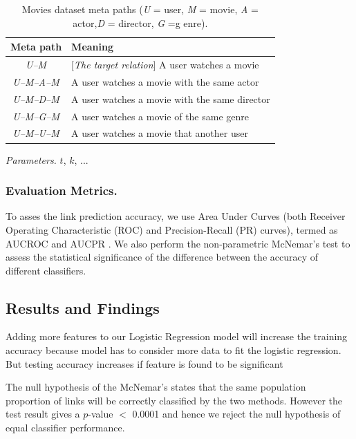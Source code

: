 \begin{table}[h]
\centering
\caption{Movies dataset meta paths (\textit{U} = user, \textit{M} = movie, \textit{A} = actor,\textit{D} = director, \textit{G} =g enre).}
\label{table_movies}\scriptsize
\begin{tabular}{|c|l|} \hline
\textbf{Meta path} & \textbf{Meaning} \\ \hline
\textit{U--M} & [\textit{The target relation}] A user watches a movie \\ \hline

\textit{U--M--A--M} & A user watches a movie with the same actor \\ \hline
\textit{U--M--D--M} & A user watches a movie with the same director \\ \hline
\textit{U--M--G--M} & A user watches a movie of the same genre \\ \hline
\textit{U--M--U--M} & A user watches a movie that another user  \\ \hline

\end{tabular}
\end{table}


\textit{Parameters.} $t$, $k$, ...


\subsubsection{Evaluation Metrics.} 

To asses the link prediction accuracy, we use Area Under Curves (both Receiver Operating Characteristic (ROC) and Precision-Recall (PR) curves), termed as AUCROC and AUCPR \cite{davis2006relationship}. We also perform the non-parametric McNemar's test \cite{mcnemar1947note} to assess the statistical significance of the difference between the accuracy of different classifiers.


\subsection{Results and Findings}

Adding more features to our Logistic Regression model will increase the training accuracy because model has to consider more data to fit the logistic regression. But testing accuracy increases if feature is found to be significant

The null hypothesis of the McNemar's states that the same population proportion of links will be correctly classified by the two methods. However the test result gives a $p$-value $<$ 0.0001 and hence we reject the null hypothesis of equal classifier performance.

